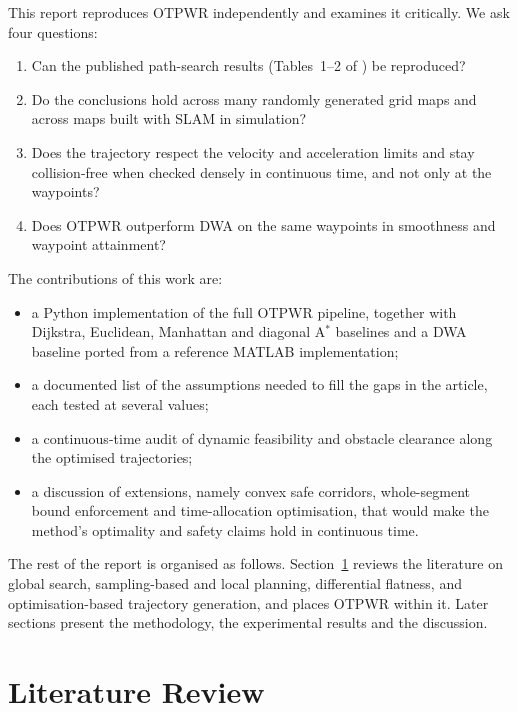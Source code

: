 \documentclass[11pt,a4paper]{article}
\begin{document}
This report reproduces OTPWR independently and examines it critically. We
ask four questions:
\begin{enumerate}[label=\textbf{Q\arabic*.},nosep]
  \item Can the published path-search results (Tables~1--2 of
        \citep{luo2024otpwr}) be reproduced?
  \item Do the conclusions hold across many randomly generated grid maps and
        across maps built with SLAM in simulation?
  \item Does the trajectory respect the velocity and acceleration limits and
        stay collision-free when checked densely in continuous time, and not
        only at the waypoints?
  \item Does OTPWR outperform DWA on the same waypoints in smoothness and
        waypoint attainment?
\end{enumerate}

The contributions of this work are:
\begin{itemize}[nosep]
  \item a Python implementation of the full OTPWR pipeline, together
        with Dijkstra, Euclidean, Manhattan and diagonal A$^\ast$ baselines
        and a DWA baseline ported from a reference MATLAB implementation;
  \item a documented list of the assumptions needed to fill the gaps in the
        article, each tested at several values;
  \item a continuous-time audit of dynamic feasibility and obstacle clearance
        along the optimised trajectories;
  \item a discussion of extensions, namely convex safe corridors,
        whole-segment bound enforcement and time-allocation optimisation,
        that would make the method's optimality and safety claims hold in
        continuous time.
\end{itemize}

The rest of the report is organised as follows.
Section~\ref{sec:lit} reviews the literature on global search,
sampling-based and local planning, differential flatness, and
optimisation-based trajectory generation, and places OTPWR within it.
Later sections present the methodology, the experimental results and the
discussion.

\section{Literature Review}
\label{sec:lit}
\end{document}
